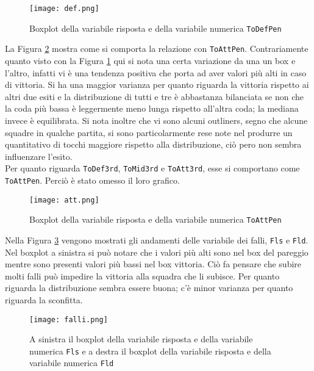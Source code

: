 \begin{figure}[htbp]
	\begin{center}
		\texttt{[image: def.png]}
		\caption{Boxplot della variabile risposta e della variabile numerica \texttt{ToDefPen} } \label{fig:defp}
	\end{center}
\end{figure}

La Figura \ref{fig:att} mostra come si comporta la relazione con \texttt{ToAttPen}. Contrariamente quanto visto con la Figura \ref{fig:defp} qui si nota una certa variazione da una un box e l'altro, infatti vi è una tendenza positiva che porta ad aver valori più alti in caso di vittoria. Si ha una maggior varianza per quanto riguarda la vittoria rispetto ai altri due esiti e la distribuzione di tutti e tre è abbastanza bilanciata se non che la coda più bassa è leggermente meno lunga rispetto all'altra coda; la mediana invece è equilibrata. Si nota inoltre che vi sono alcuni outliners, segno che alcune squadre in qualche partita, si sono particolarmente rese note nel produrre un quantitativo di tocchi maggiore rispetto alla distribuzione, ciò pero non sembra influenzare l'esito.\\

Per quanto riguarda \texttt{ToDef3rd}, \texttt{ToMid3rd} e \texttt{ToAtt3rd}, esse si comportano come \texttt{ToAttPen}. Perciò è stato omesso il loro grafico.\\

\begin{figure}[htbp]
	\begin{center}
		\texttt{[image: att.png]}
		\caption{Boxplot della variabile risposta e della variabile numerica \texttt{ToAttPen} } \label{fig:att}
	\end{center}
\end{figure}

Nella Figura \ref{fig:falli} vengono mostrati gli andamenti delle variabile dei falli, \texttt{Fls} e \texttt{Fld}. Nel boxplot a sinistra si può notare che i valori più alti sono nel box del pareggio mentre sono presenti valori più bassi nel box vittoria. Ciò fa pensare che subire molti falli può impedire la vittoria alla squadra che li subisce. Per quanto riguarda la distribuzione sembra essere buona; c'è minor varianza per quanto riguarda la sconfitta. \\

\begin{figure}[htbp]
	\begin{center}
		\texttt{[image: falli.png]}
		\caption{A sinistra il boxplot della variabile risposta e della variabile numerica \texttt{Fls} e a destra il boxplot della variabile risposta e della variabile numerica \texttt{Fld} } \label{fig:falli}
	\end{center}
\end{figure}

